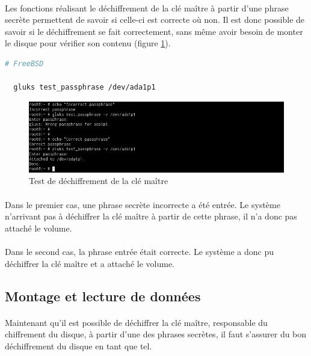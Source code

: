 \paragraph{}
Les fonctions réalisant le déchiffrement de la clé maître à partir d'une phrase
secrète permettent de savoir si celle-ci est correcte où non. Il est donc
possible de savoir si le déchiffrement se fait correctement, sans même avoir
besoin de monter le disque pour vérifier son contenu (figure
\ref{fig:freebsd_test_passphrase}).
\\
\begin{lstlisting}[language=bash]
  # FreeBSD

  gluks test_passphrase /dev/ada1p1
\end{lstlisting}
\begin{figure}[H]
  \centering
  \includegraphics[width=\linewidth]{tests/freebsd_test_passphrase.png}
  \caption{\label{fig:freebsd_test_passphrase}Test de déchiffrement de la clé maître}
\end{figure}
\paragraph{}
Dans le premier cas, une phrase secrète incorrecte a été entrée. Le système
n'arrivant pas à déchiffrer la clé maître à partir de cette phrase, il n'a donc
pas attaché le volume.
\paragraph{}
Dans le second cas, la phrase entrée était correcte. Le système a donc pu
déchiffrer la clé maître et a attaché le volume.

\subsection{Montage et lecture de données}
\paragraph{}
Maintenant qu'il est possible de déchiffrer la clé maître, responsable du
chiffrement du disque, à partir d'une des phrases secrètes, il faut s'assurer du
bon déchiffrement du disque en tant que tel.
